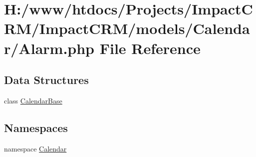 \hypertarget{Alarm_8php}{
\section{H:/www/htdocs/Projects/ImpactCRM/ImpactCRM/models/Calendar/Alarm.php File Reference}
\label{Alarm_8php}
}
\subsection*{Data Structures}
\begin{DoxyCompactItemize}
\item 
class \hyperlink{classCalendarBase}{CalendarBase}
\end{DoxyCompactItemize}
\subsection*{Namespaces}
\begin{DoxyCompactItemize}
\item 
namespace \hyperlink{namespaceCalendar}{Calendar}
\end{DoxyCompactItemize}
